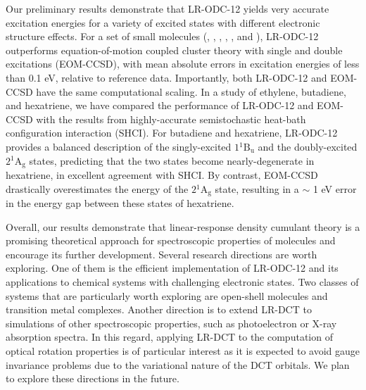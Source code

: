 Our preliminary results demonstrate that LR-ODC-12 yields very accurate
excitation energies for a variety of excited states with different electronic
structure effects. For a set of small molecules (, , ,
, , and ), LR-ODC-12 outperforms equation-of-motion
coupled cluster theory with single and double excitations (EOM-CCSD), with mean
absolute errors in excitation energies of less than 0.1 eV, relative to
reference data.
Importantly, both LR-ODC-12 and EOM-CCSD have the same computational scaling. In
a study of ethylene, butadiene, and hexatriene, we have compared the performance
of LR-ODC-12 and EOM-CCSD with the results from highly-accurate semistochastic
heat-bath configuration interaction (SHCI).
For
butadiene and hexatriene, LR-ODC-12 provides a balanced description of the
singly-excited $1{}^1\mathrm{B_{u}}$ and the doubly-excited
$2{}^1\mathrm{A_{g}}$ states, predicting that the two states become
nearly-degenerate in hexatriene, in excellent agreement with SHCI\@.
By contrast, EOM-CCSD drastically overestimates the energy of the
$2{}^1\mathrm{A_{g}}$ state, resulting in a $\sim$ 1 eV error in the energy gap
between these states of hexatriene.

Overall, our results demonstrate that linear-response density cumulant theory is
a promising theoretical approach for spectroscopic properties of molecules and
encourage its further development.
Several research directions are worth exploring. One of them is the efficient implementation of LR-ODC-12 and its applications to chemical systems with challenging electronic states. Two classes of systems that are particularly worth exploring are open-shell molecules and transition metal complexes. Another direction is to extend LR-DCT to simulations of other spectroscopic properties, such as photoelectron or X-ray absorption spectra.
In this regard, applying LR-DCT to the computation of optical rotation
properties is of particular interest as it is expected to avoid gauge invariance
problems due to the variational nature of the DCT orbitals.\cite{Lindh:2012p125}
We plan to explore these directions in the future.  

